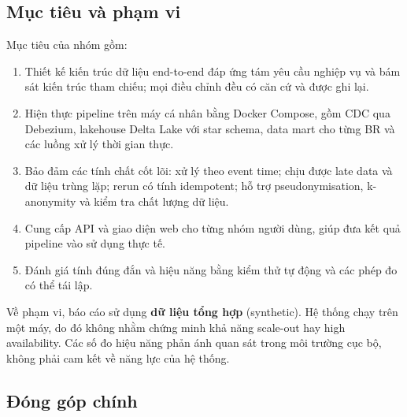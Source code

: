 \subsection{Mục tiêu và phạm vi}

Mục tiêu của nhóm gồm:
\begin{enumerate}
  \item Thiết kế kiến trúc dữ liệu end-to-end đáp ứng tám yêu cầu nghiệp vụ và bám sát kiến trúc tham chiếu; mọi điều chỉnh đều có căn cứ và được ghi lại.
  \item Hiện thực pipeline trên máy cá nhân bằng Docker Compose, gồm CDC qua Debezium, lakehouse Delta Lake với star schema, data mart cho từng BR và các luồng xử lý thời gian thực.
  \item Bảo đảm các tính chất cốt lõi: xử lý theo event time; chịu được late data và dữ liệu trùng lặp; rerun có tính idempotent; hỗ trợ pseudonymisation, k-anonymity và kiểm tra chất lượng dữ liệu.
  \item Cung cấp API và giao diện web cho từng nhóm người dùng, giúp đưa kết quả pipeline vào sử dụng thực tế.
  \item Đánh giá tính đúng đắn và hiệu năng bằng kiểm thử tự động và các phép đo có thể tái lập.
\end{enumerate}

Về phạm vi, báo cáo sử dụng \textbf{dữ liệu tổng hợp} (synthetic). Hệ thống chạy trên một máy, do đó không nhằm chứng minh khả năng scale-out hay high availability. Các số đo hiệu năng phản ánh quan sát trong môi trường cục bộ, không phải cam kết về năng lực của hệ thống.

\subsection{Đóng góp chính}

